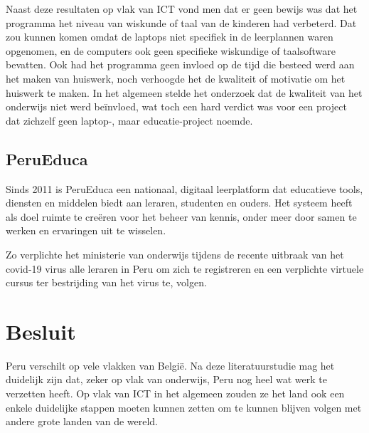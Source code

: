 Naast deze resultaten op vlak van ICT vond men dat er geen bewijs was dat het programma het niveau van wiskunde of taal van de kinderen had verbeterd. Dat zou kunnen komen omdat de laptops niet specifiek in de leerplannen waren opgenomen, en de computers ook geen specifieke wiskundige of taalsoftware bevatten. Ook had het programma geen invloed op de tijd die besteed werd aan het maken van huiswerk, noch verhoogde het de kwaliteit of motivatie om het huiswerk te maken. In het algemeen stelde het onderzoek dat de kwaliteit van het onderwijs niet werd beïnvloed, wat toch een hard verdict was voor een project dat zichzelf geen laptop-, maar educatie-project noemde. \autocite{Ibarraran2012}

\subsection{PeruEduca}
Sinds 2011 is PeruEduca een nationaal, digitaal leerplatform dat educatieve tools, diensten en middelen biedt aan leraren, studenten en ouders. Het systeem heeft als doel ruimte te creëren voor het beheer van kennis, onder meer door samen te werken en ervaringen uit te wisselen. \autocite{EducationPeru2020}

Zo verplichte het ministerie van onderwijs tijdens de recente uitbraak van het covid-19 virus alle leraren in Peru om zich te registreren en een verplichte virtuele cursus ter bestrijding van het virus te, volgen. \autocite{Educacion2020}

\section{Besluit}
Peru verschilt op vele vlakken van België. Na deze literatuurstudie mag het duidelijk zijn dat, zeker op vlak van onderwijs, Peru nog heel wat werk te verzetten heeft. Op vlak van ICT in het algemeen zouden ze het land ook een enkele duidelijke stappen moeten kunnen zetten om te kunnen blijven volgen met andere grote landen van de wereld. 



